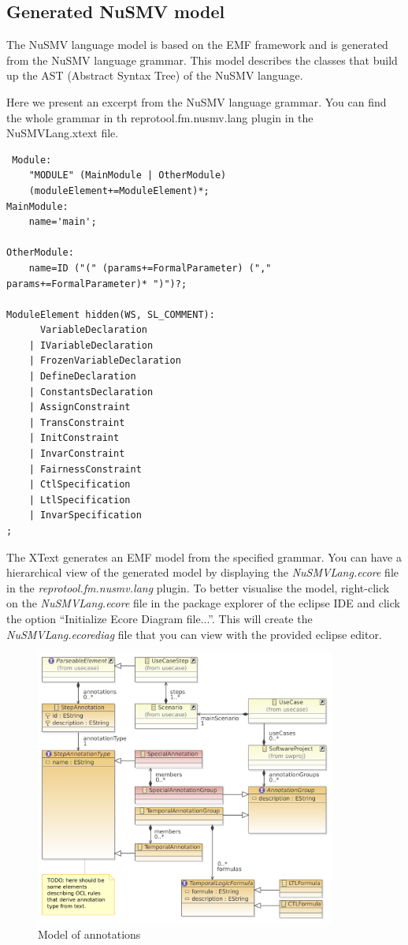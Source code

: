 \subsection{Generated NuSMV model}

The NuSMV language model is based on the EMF framework and is generated from the NuSMV language grammar.
This model describes the classes that build up the AST (Abstract Syntax Tree) of the NuSMV language.

Here we present an excerpt from the NuSMV language grammar. You can find the whole grammar in th
reprotool.fm.nusmv.lang plugin in the NuSMVLang.xtext file.

\begin{lstlisting}
 Module:
	"MODULE" (MainModule | OtherModule)
	(moduleElement+=ModuleElement)*;
MainModule:
	name='main';

OtherModule:
	name=ID ("(" (params+=FormalParameter) ("," params+=FormalParameter)* ")")?;

ModuleElement hidden(WS, SL_COMMENT):
	  VariableDeclaration
	| IVariableDeclaration
	| FrozenVariableDeclaration
	| DefineDeclaration
	| ConstantsDeclaration
	| AssignConstraint
	| TransConstraint
	| InitConstraint
	| InvarConstraint
	| FairnessConstraint
	| CtlSpecification
	| LtlSpecification
	| InvarSpecification
;
\end{lstlisting}

The XText generates an EMF model from the specified grammar. You can have a hierarchical view of the generated model by displaying the
\emph{NuSMVLang.ecore} file in the \emph{reprotool.fm.nusmv.lang} plugin. To better visualise the model, right-click on the \emph{NuSMVLang.ecore} file in
the package explorer of the eclipse IDE and click the option ``Initialize Ecore Diagram file...''. This will create the \emph{NuSMVLang.ecorediag} file that you can view with the provided eclipse editor.

\begin{figure}
  \centering
  \includegraphics[width=280pt]{images/ReprotoolUCAnnotModel}
  \caption{Model of annotations}
  \label{fig:ModelOfAnnotations}
\end{figure}

